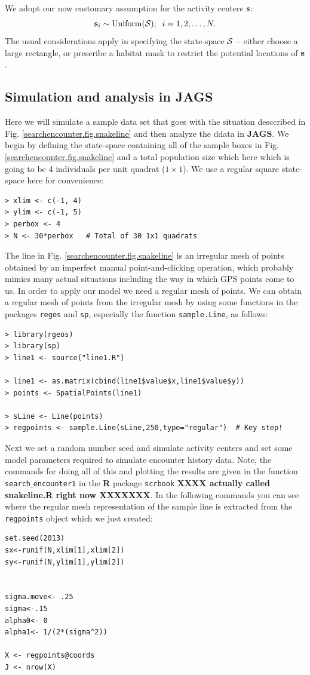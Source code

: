 We adopt our now customary assumption for the activity centers ${\bf s}$:
\[
 {\bf s}_{i} \sim \mbox{Uniform}({\cal S}); \; \; i=1,2,\ldots,N.
\]
The usual considerations apply in specifying the state-space ${\cal
  S}$ -- either choose a large rectangle, or prescribe a habitat mask
to restrict the potential locations of ${\bf s}$.



\subsection{Simulation and analysis in {\bf JAGS}}

Here we will simulate a sample data set that goes with the situation
desccribed in Fig. \ref{searchencounter.fig.snakeline} and then analyze the ddata in
{\bf JAGS}.  We begin by defining the state-space containing all of
the sample boxes in Fig. \ref{searchencounter.fig.snakeline} and a total population
size which here which is going to be 4 individuals per unit quadrat
($1 \times 1$). We use a regular square state-space here for
convenience:
\begin{verbatim}
> xlim <- c(-1, 4)
> ylim <- c(-1, 5)
> perbox <- 4
> N <- 30*perbox   # Total of 30 1x1 quadrats
\end{verbatim}
The line in Fig. \ref{searchencounter.fig.snakeline}  is an irregular mesh of points
obtained by an imperfect manual point-and-clicking operation, which
probably mimics many actual situations including the way in which GPS
points come to us. In order to apply our model we need a regular mesh
of points. We can obtain a regular mesh of points from the irregular
mesh by using
some functions in the packages \mbox{\tt regos}
and \mbox{\tt sp}, especially the function \mbox{\tt sample.Line}, as follows:
\begin{verbatim}
> library(rgeos)
> library(sp)
> line1 <- source("line1.R")

> line1 <- as.matrix(cbind(line1$value$x,line1$value$y))
> points <- SpatialPoints(line1)

> sLine <- Line(points)
> regpoints <- sample.Line(sLine,250,type="regular")  # Key step!
\end{verbatim}
Next we set a random number seed and simulate activity centers and set
some model parameters required to simulate encounter history data.
Note, the commands for doing all of this and plotting the results are given
in the function \mbox{\tt search$\_$encounter1} in the {\bf R} package
\mbox{\tt scrbook} {\bf XXXX actually called snakeline.R right now
XXXXXXX}.
In the following commands you can see where the
regular mesh representation of the sample line is extracted from the
\mbox{\tt regpoints} object which we just created:
\begin{verbatim}
set.seed(2013)
sx<-runif(N,xlim[1],xlim[2])
sy<-runif(N,ylim[1],ylim[2])


sigma.move<- .25
sigma<-.15
alpha0<- 0
alpha1<- 1/(2*(sigma^2))

X <- regpoints@coords
J <- nrow(X)
\end{verbatim}

